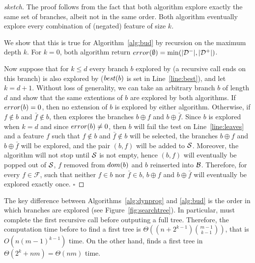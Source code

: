 \documentclass{llncs}
\def\posclass{+}
\def\negclass{-}
\def\datasymb{D}
\newcommand{\setex}[1]{\ensuremath{{\mathcal \datasymb}^{#1}}\xspace}
\newcommand{\posex}{{\setex{\posclass}}\xspace}
\newcommand{\negex}{{\setex{\negclass}}\xspace}
\newcommand{\features}{\ensuremath{{\mathcal F}}\xspace}
\newcommand{\bud}[0]{\ensuremath{{\cal B}}}
\newcommand{\sequence}[0]{\ensuremath{{\cal S}}}
\newcommand{\afeat}[0]{\ensuremath{f}}
\newcommand{\dom}[1][]{\ensuremath{\ifthenelse{\equal{#1}{}}{dom}{dom({#1})}}}
\newcommand{\best}[1][]{\ensuremath{\ifthenelse{\equal{#1}{}}{{best}}{{best({#1})}}}}
\newcommand{\error}[1][]{\ensuremath{\ifthenelse{\equal{#1}{}}{{error}}{{error({{#1}})}}}}
\newcommand{\abranch}[0]{\ensuremath{b}}
\newcommand{\numex}[0]{\ensuremath{n}}
\newcommand{\numfeat}[0]{\ensuremath{m}}
\newcommand{\mdepth}[0]{\ensuremath{k}}
\newcommand{\grow}[2]{\ensuremath{{#1}\oplus{#2}}}
\begin{document}
			\begin{proof}[sketch]
				The proof follows from the fact that both algorithm explore exactly the same set of branches, albeit not in the same order.
				Both algorithm eventually explore every combination of (negated) feature of size $\mdepth$.
				
				We show that this is true for Algorithm~\ref{alg:bud} by recursion on the maximum depth $\mdepth$.
				For $\mdepth = 0$, both algorithm return $\error[\emptyset]=\min(|\negex|, |\posex|)$.
				
				Now suppose that for $\mdepth \leq d$ every branch $\abranch$ explored by \dynprog (a recursive call ends on this branch) is also explored by \budalg ($\best[\abranch]$ is set in Line~\ref{line:best}), and let $\mdepth=d+1$. Without loss of generality, we can take an arbitrary branch $\abranch$ of length $d$ and show that the same extentions of $\abranch$ are explored by both algorithms.
				If $\error[\abranch]=0$, then no extension of $\abranch$ is explored by either algorithm.
				Otherwise, if $\afeat \not\in \abranch$ and $\bar{\afeat}\not\in \abranch$, then 
				\dynprog explores the branches $\grow{\abranch}{\afeat}$ and $\grow{\abranch}{\bar{\afeat}}$.
				Since $\abranch$ is explored when $\mdepth = d$ and since $\error[\abranch] \neq 0$, then $\abranch$ will fail the test on Line~\ref{line:leaves} and a feature $\afeat$ such that $\afeat \not\in \abranch$ and $\bar{\afeat}\not\in \abranch$ will be selected, 
				the branches $\grow{\abranch}{\afeat}$ and $\grow{\abranch}{\bar{\afeat}}$ will be explored, and the pair $(\abranch, \afeat)$ will be added to $\sequence$. 
				Moreover, the algorithm will not stop until $\sequence$ is not empty, hence $(\abranch, \afeat)$ will eventually be popped out of $\sequence$, $\afeat$ removed from $\dom[\abranch]$ and $\abranch$ reinserted into $\bud$. Therefore, for every $\afeat \in \features$, such that neither $\afeat \in \abranch$ nor $\bar{\afeat}\in \abranch$,
				 $\grow{\abranch}{\afeat}$ and $\grow{\abranch}{\bar{\afeat}}$ will eventually be explored exactly once.
				\hfill$\square$
			\end{proof}
			
			\medskip
			
			The key difference between Algorithms~\ref{alg:dynprog} and \ref{alg:bud} is the order in which branches are explored (see Figure~\ref{fig:searchtree}). In particular, \dynprog must complete the first recursive call before outputing a full tree. Therefore, the computation time before to find a first tree is $\Theta((\numex+2^{\mdepth-1}){\numfeat-1 \choose \mdepth-1})$, that is $O(\numex(\numfeat-1)^{\mdepth-1})$ time. On the other hand, \budalg finds a first tree in $\Theta(2^{\mdepth}+\numex\numfeat) = \Theta(\numex\numfeat)$ time.
			
\end{document}
